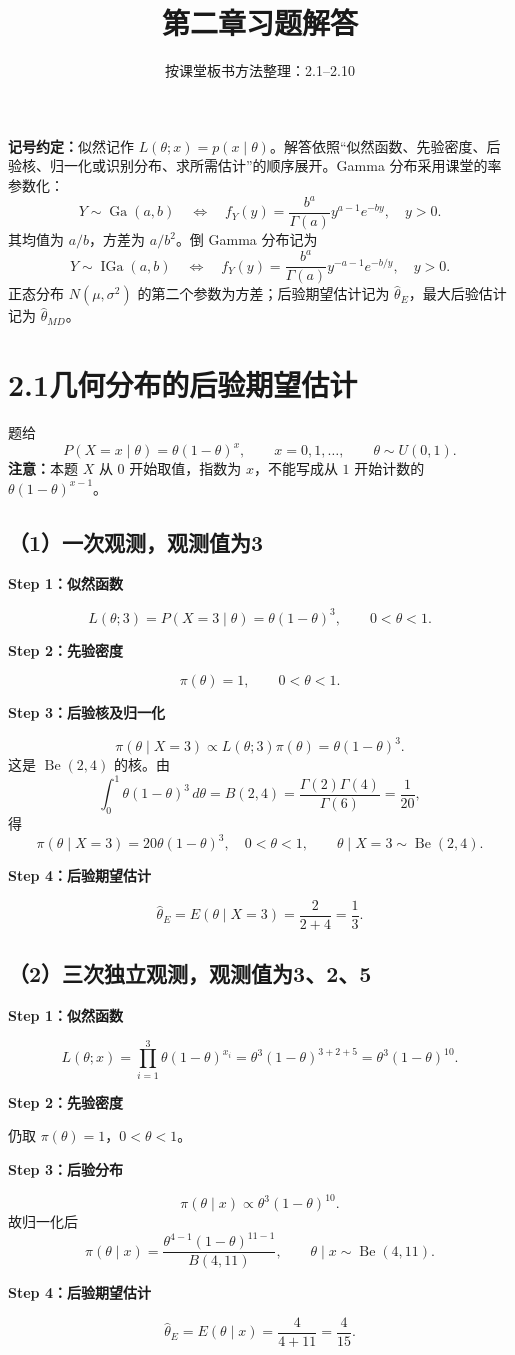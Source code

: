 \documentclass[UTF8,zihao=-4]{ctexart}
\title{第二章习题解答}
\author{按课堂板书方法整理：2.1--2.10}
\date{}
\newcommand{\step}[1]{\par\medskip\noindent\textbf{#1}\par\nopagebreak}
\newcommand{\Be}{\operatorname{Be}}
\newcommand{\Ga}{\operatorname{Ga}}
\newcommand{\IGa}{\operatorname{IGa}}
\begin{document}
\maketitle
\noindent\textbf{记号约定：}似然记作 $L(\theta;x)=p(x\mid\theta)$。解答依照“似然函数、先验密度、后验核、归一化或识别分布、求所需估计”的顺序展开。Gamma 分布采用课堂的率参数化：
\[
Y\sim\Ga(a,b)\quad\Longleftrightarrow\quad
f_Y(y)=\frac{b^a}{\Gamma(a)}y^{a-1}e^{-by},\quad y>0.
\]
其均值为 $a/b$，方差为 $a/b^2$。倒 Gamma 分布记为
\[
Y\sim\IGa(a,b)\quad\Longleftrightarrow\quad
f_Y(y)=\frac{b^a}{\Gamma(a)}y^{-a-1}e^{-b/y},\quad y>0.
\]
正态分布 $N(\mu,\sigma^2)$ 的第二个参数为方差；后验期望估计记为 $\hat\theta_E$，最大后验估计记为 $\hat\theta_{MD}$。
\section*{2.1\quad 几何分布的后验期望估计}
题给
\[
P(X=x\mid\theta)=\theta(1-\theta)^x,\qquad x=0,1,\ldots,
\qquad\theta\sim U(0,1).
\]
\textbf{注意：}本题 $X$ 从 $0$ 开始取值，指数为 $x$，不能写成从 $1$ 开始计数的 $\theta(1-\theta)^{x-1}$。

\subsection*{（1）一次观测，观测值为3}
\step{Step 1：似然函数}
\[
L(\theta;3)=P(X=3\mid\theta)=\theta(1-\theta)^3,\qquad0<\theta<1.
\]
\step{Step 2：先验密度}
\[
\pi(\theta)=1,\qquad0<\theta<1.
\]
\step{Step 3：后验核及归一化}
\[
\pi(\theta\mid X=3)\propto L(\theta;3)\pi(\theta)
=\theta(1-\theta)^3.
\]
这是 $\Be(2,4)$ 的核。由
\[
\int_0^1\theta(1-\theta)^3\,d\theta
=B(2,4)=\frac{\Gamma(2)\Gamma(4)}{\Gamma(6)}=\frac1{20},
\]
得
\[
\pi(\theta\mid X=3)=20\theta(1-\theta)^3,\quad0<\theta<1,
\qquad\theta\mid X=3\sim\Be(2,4).
\]
\step{Step 4：后验期望估计}
\[
\boxed{\hat\theta_E=E(\theta\mid X=3)=\frac2{2+4}=\frac13.}
\]

\subsection*{（2）三次独立观测，观测值为3、2、5}
\step{Step 1：似然函数}
\[
L(\theta;x)=\prod_{i=1}^3\theta(1-\theta)^{x_i}
=\theta^3(1-\theta)^{3+2+5}=\theta^3(1-\theta)^{10}.
\]
\step{Step 2：先验密度}
仍取 $\pi(\theta)=1$，$0<\theta<1$。
\step{Step 3：后验分布}
\[
\pi(\theta\mid x)\propto\theta^3(1-\theta)^{10}.
\]
故归一化后
\[
\pi(\theta\mid x)=\frac{\theta^{4-1}(1-\theta)^{11-1}}{B(4,11)},
\qquad\boxed{\theta\mid x\sim\Be(4,11).}
\]
\step{Step 4：后验期望估计}
\[
\boxed{\hat\theta_E=E(\theta\mid x)=\frac4{4+11}=\frac4{15}.}
\]
\end{document}
